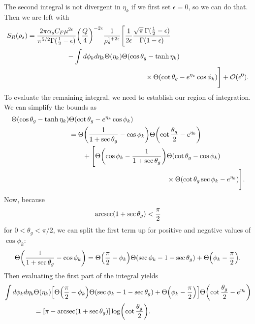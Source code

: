 \documentclass[../thesis.tex]{subfiles}
\providecommand{\cO}{\mathcal{O}}
\begin{document}
	The second integral is not divergent in $\eta_k$ if we first set $\epsilon = 0$, so we can do that. Then we are left with
	\begin{equation}
	\begin{aligned}
		S_R(\rho_s) &= \frac{2\pi \alpha_s C_F \mu^{2\epsilon}}{\pi^{5/2} \Gamma(\frac{1}{2} - \epsilon)} \qty(\frac{Q}{4})^{-2\epsilon} \frac{1}{\rho_s^{1 + 2\epsilon}} \Bigg[ \frac{1}{2\epsilon} \frac{\sqrt{\pi}\,\Gamma(\frac{1}{2} - \epsilon)}{\Gamma(1 - \epsilon)}  \\
			&\hspace{2cm}- \int d\phi_k d\eta_k \Theta(\eta_k) \Theta(\cos\theta_g - \tanh\eta_k) \\
			&\hspace{6cm}\times \Theta\qty(\cot\theta_g - e^{\eta_k}\cos\phi_k) \Bigg] + \cO(\epsilon^0).
	\end{aligned}
	\end{equation}
	To evaluate the remaining integral, we need to establish our region of integration. We can simplify the bounds as
	\begin{equation}
	\begin{aligned}
		\Theta(\cos\theta_g - \tanh\eta_k)&\Theta\qty(\cot\theta_g - e^{\eta_k}\cos\phi_k) \\
		&= \Theta\qty(\frac{1}{1+\sec\theta_g} - \cos\phi_k)\Theta\qty(\cot\frac{\theta_g}{2} - e^{\eta_k}) \\
			&\qquad+ \Bigg[\Theta\qty(\cos\phi_k - \frac{1}{1+\sec\theta_g})\Theta(\cot\theta_g - \cos\phi_k)\\
			&\hspace{5cm} \times \Theta\qty(\cot\theta_g\sec\phi_k - e^{\eta_k}) \Bigg].
	\end{aligned}
	\end{equation}
	Now, because
	\begin{equation}
		\arcsec(1 + \sec\theta_g) < \frac{\pi}{2}
	\end{equation}
	for $0 < \theta_g < \pi/2$, we can split the first term up for positive and negative values of $\cos\phi_k$:
	\begin{equation}
		\Theta\qty(\frac{1}{1+\sec\theta_g} - \cos\phi_k) = \Theta\qty(\frac{\pi}{2} - \phi_k)\Theta\qty(\sec\phi_k - 1 - \sec\theta_g) + \Theta\qty(\phi_k - \frac{\pi}{2}).
	\end{equation}
	Then evaluating the first part of the integral yields
	\begin{equation}
	\begin{aligned}
		\int d\phi_k d\eta_k &\Theta(\eta_k) \qty[\Theta\qty(\frac{\pi}{2} - \phi_k)\Theta\qty(\sec\phi_k - 1 - \sec\theta_g) + \Theta\qty(\phi_k - \frac{\pi}{2})]\Theta\qty(\cot\frac{\theta_g}{2} - e^{\eta_k}) \\
		&= \qty[\pi - \arcsec(1 + \sec\theta_g)] \log(\cot\frac{\theta_g}{2}).
	\end{aligned}
	\end{equation}
	
\end{document}
